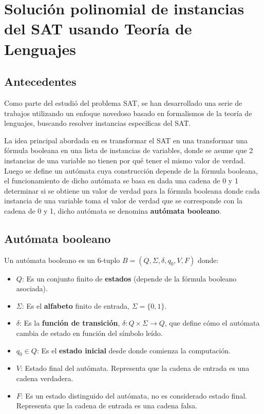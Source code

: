 \chapter{Solución polinomial de instancias del SAT usando Teoría de Lenguajes}

\section{Antecedentes}

Como parte del estudió del problema SAT, se han desarrollado una serie de trabajos utilizando un enfoque
novedoso basado en formalismos de la teoría de lenguajes, buscando resolver instancias específicas del SAT.

La idea principal abordada en \cite{aCFSAT} es transformar el SAT en una transformar una fórmula booleana en una lista de instancias de variables,
donde se asume que 2 instancias de una variable no tienen por qué tener el mismo valor de verdad. Luego
se define un autómata cuya construcción depende de la fórmula booleana, el funcionamiento
de dicho autómata se basa en dada una cadena de 0 y 1 determinar si se obtiene un valor
de verdad para la fórmula booleana donde cada instancia de una variable toma el valor de verdad que se
corresponde con la cadena de 0 y 1, dicho autómata se denomina \textbf{autómata booleano}.

\section{Autómata booleano}

Un autómata booleano \cite{aCFSAT} es un 6-tuplo $B=(Q,\Sigma,\delta,q_0,V,F)$ donde:

\begin{itemize}
      \item $Q$: Es un conjunto finito de \textbf{estados} (depende de la fórmula booleano asociada).
      \item $\Sigma$: Es el \textbf{alfabeto} finito de entrada, $\Sigma =\{0,1\}$.
      \item $\delta$: Es la \textbf{función de transición}, $\delta: Q \times \Sigma \to Q$, que define cómo el autómata cambia de estado en función del símbolo leído.
      \item $q_0 \in Q$: Es el \textbf{estado inicial} desde donde comienza la computación.
      \item  $V$: Estado final del autómata. Representa que la cadena de entrada es una
            cadena verdadera.
      \item  $F$: Es un estado distinguido del autómata, no es considerado estado final.
            Representa que la cadena de entrada es una cadena falsa.
            
\end{itemize}

